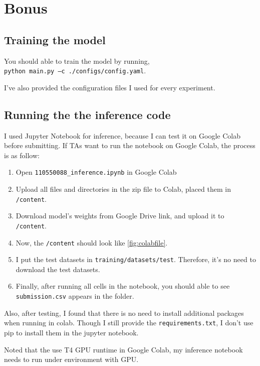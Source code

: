 \documentclass[twocolumn]{extarticle}
\begin{document}
\section{Bonus\label{sec: bonus}}

\subsection{Training the model}

You should able to train the model by running, \\
\texttt{python main.py --c ./configs/config.yaml}.

I've also provided the configuration files I used for every experiment.

\subsection{Running the the inference code}

I used Jupyter Notebook for inference, because I can test it on Google Colab before submitting. If TAs want to run the notebook on Google Colab, the process is as follow:

\begin{enumerate}
\item Open \texttt{110550088\_inference.ipynb} in Google Colab
\item Upload all files and directories in the zip file to Colab, placed them in \texttt{/content}.
\item Download model's weights from Google Drive link, and upload it to \texttt{/content}.
\item Now, the \texttt{/content} should look like \autoref{fig:colabfile}.
\item I put the test datasets in \texttt{training/datasets/test}. Therefore, it's no need to download the test datasets.
\item Finally, after running all cells in the notebook, you should able to see \texttt{submission.csv} appears in the folder.
\end{enumerate}

Also, after testing, I found that there is no need to install additional packages when running in colab. Though I still provide the \texttt{requirements.txt}, I don't use pip to install them in the jupyter notebook.

Noted that the use T4 GPU runtime in Google Colab, my inference notebook needs to run under environment with GPU.
\end{document}
